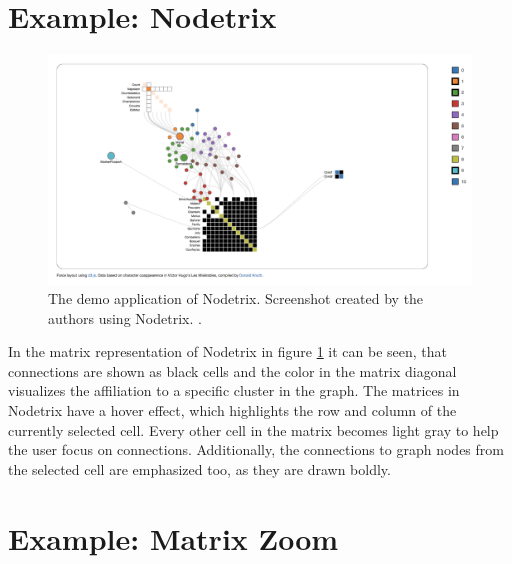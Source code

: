 \section{Example: Nodetrix}


\begin{figure}[tp]
\includegraphics[width=\textwidth]{images/nodetrix_cell}
\caption[Cell Visualization in Nodetrix]{The demo application of Nodetrix. Screenshot created by the authors using Nodetrix. \citep[1302-1309]{henry-nodetrix-2007}.\label{fig:cell_nodetrix}}
\end{figure}



In the matrix representation of Nodetrix in figure \ref{fig:cell_nodetrix} it can be seen, that connections are shown as black cells and the color in the matrix diagonal visualizes the affiliation to a specific cluster in the graph. The matrices in Nodetrix have a hover effect, which highlights the row and column of the currently selected cell. Every other cell in the matrix becomes light gray to help the user focus on connections. Additionally, the connections to graph nodes from the selected cell are emphasized too, as they are drawn boldly. \citep[1302-1309]{henry-nodetrix-2007}

\section{Example: Matrix Zoom}


